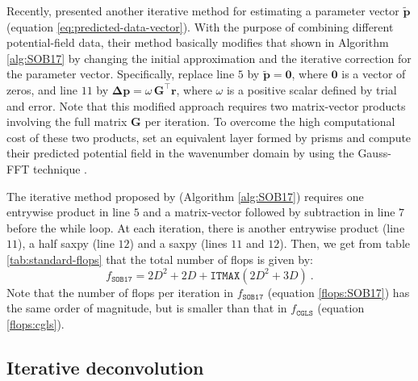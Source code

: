 Recently, \citet{jirigalatu-ebbing2019} presented another iterative method for estimating a parameter 
vector $\tilde{\mathbf{p}}$ (equation \ref{eq:predicted-data-vector}). 
With the purpose of combining different potential-field data, 
their method basically modifies that shown in Algorithm \ref{alg:SOB17} by changing the initial approximation 
and the iterative correction for the parameter vector.
Specifically, \citet{jirigalatu-ebbing2019} replace line $5$ by $\tilde{\mathbf{p}} = \mathbf{0}$, where $\mathbf{0}$ is a vector of zeros,
and line $11$ by $\boldsymbol{\Delta}\mathbf{p} = \omega \, \mathbf{G}^{\top} \mathbf{r}$, where $\omega$ is a positive
scalar defined by trial and error.
Note that this modified approach requires two matrix-vector products involving the full matrix $\mathbf{G}$ per iteration.
To overcome the high computational cost of these two products, \citet{jirigalatu-ebbing2019} set an equivalent layer formed by
prisms and compute their predicted potential field in the wavenumber domain by using the Gauss-FFT technique
\cite{zhao-etal2018}.

The iterative method proposed by \citet{siqueira-etal2017} (Algorithm \ref{alg:SOB17}) requires one entrywise product in line $5$ and a matrix-vector followed by subtraction 
in line $7$ before the while loop. 
At each iteration, there is another entrywise product (line $11$), a half saxpy 
(line $12$) and a saxpy (lines $11$ and $12$). Then, we get from table \ref{tab:standard-flops} that the total number of flops is given by:
\begin{equation}
	f_{\mathtt{SOB17}} = 2D^{2} + 2D + \mathtt{ITMAX} \left( 2D^{2} + 3D \right) \: .
	\label{flops:SOB17}
\end{equation}
Note that the number of flops per iteration in $f_{\mathtt{SOB17}}$ (equation \ref{flops:SOB17}) has the same order of magnitude, but is smaller than that in
$f_{\mathtt{CGLS}}$ (equation \ref{flops:cgls}).

\subsection{Iterative deconvolution}

